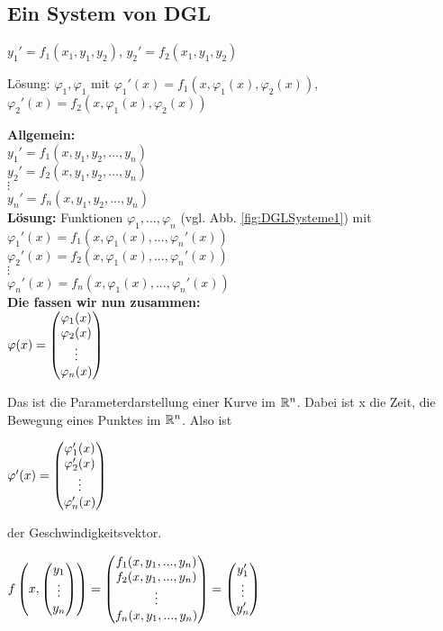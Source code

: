 \renewcommand{\ldate}{2015-11-27}

\subsection{Ein System von DGL}
$y_1' = f_1(x_1, y_1, y_2) $, 
$y_2' = f_2(x_1, y_1, y_2) $

Lösung: 
$\varphi_1, \varphi_1$ mit 
$\varphi_1'(x) = f_1(x,\varphi_1(x),\varphi_2(x))$,
$\varphi_2'(x) = f_2(x,\varphi_1(x),\varphi_2(x))$

\textbf{Allgemein:}\\
$y_1' = f_1(x,y_1,y_2,...,y_n)$\\
$y_2' = f_2(x,y_1,y_2,...,y_n)$\\
$\vdots$\\
$y_n' = f_n(x,y_1,y_2,...,y_n)$\\

\textbf{Lösung:} Funktionen $\varphi_1, ..., \varphi_n$ (vgl. Abb. \ref{fig:DGLSysteme1}) mit \\
$\varphi_1'(x) = f_1(x, \varphi_1(x), ..., \varphi_n'(x))$\\ 
$\varphi_2'(x) = f_2(x, \varphi_1(x), ..., \varphi_n'(x))$\\ 
$\vdots$\\
$\varphi_n'(x) = f_n(x, \varphi_1(x), ..., \varphi_n'(x))$\\

\textbf{Die fassen wir nun zusammen:}\\
$ \varphi(x) =  \begin{pmatrix} \varphi_1(x)\\ \varphi_2(x)\\ \vdots \\ \varphi_n(x) \end{pmatrix} $ 

Das ist die Parameterdarstellung einer Kurve im $\mathbb{R}^n$. Dabei ist x die Zeit, die Bewegung eines Punktes im $\mathbb{R}^n$. Also ist 

$\varphi'(x) =  \begin{pmatrix} \varphi_1'(x)\\\varphi_2'(x)\\\vdots \\ \varphi_n'(x) \end{pmatrix} $

der Geschwindigkeitsvektor. 

$f \left( x,  \begin{pmatrix} y_1\\\vdots\\y_n \end{pmatrix}  \right)  =  \begin{pmatrix} f_1(x,y_1,...,y_n)\\f_2(x,y_1,...,y_n)\\\vdots\\f_n(x,y_1,...,y_n)\\ \end{pmatrix}  =  \begin{pmatrix} y_1'\\\vdots\\y_n'\\ \end{pmatrix} $

